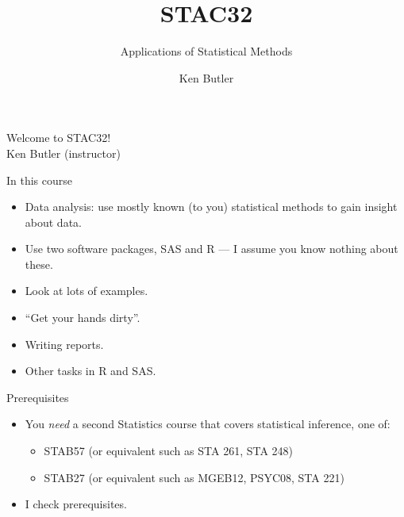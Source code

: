 \documentclass[unknownkeysallowed]{beamer}\usepackage[]{graphicx}\usepackage[]{color}
\title{STAC32}
\subtitle{Applications of Statistical Methods}
\author{Ken Butler}
\begin{document}
\maketitle






\begin{frame}[plain,c]
  \begin{center}
    {\Huge Welcome to STAC32! \\ \vspace{0.5in} Ken Butler (instructor)}
  \end{center}
\end{frame}


\begin{frame}{In this course}

  \begin{itemize}
  \item Data analysis: use mostly known (to you) statistical methods to gain
    insight about data.
  \item Use two software packages, SAS and R --- I assume you know
    nothing about these.
  \item Look at lots of examples.
  \item ``Get your hands dirty''.
  \item Writing reports.
  \item Other tasks in R and SAS.
  \end{itemize}
  
\end{frame}

\begin{frame}[fragile]{Prerequisites}
  
  
  \begin{itemize}
  \item 
      You \emph{need} a second Statistics course that covers statistical
  inference, one of: 
  
  \begin{itemize}
  \item STAB57 (or equivalent such as STA 261, STA 248)
  \item STAB27 (or equivalent such as MGEB12, PSYC08, STA 221)
  \end{itemize}
  
  \item I check prerequisites.

  \end{itemize}
  
\end{frame}
\end{document}
